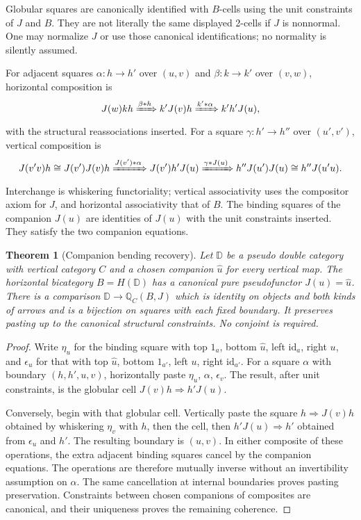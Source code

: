 \documentclass[11pt]{article}
\newtheorem{theorem}{Theorem}[section]
\theoremstyle{definition}
\newcommand{\id}{\mathrm{id}}
\newcommand{\Qrel}{\mathbb Q}
\begin{document}
Globular squares are canonically identified with $B$-cells using the unit
constraints of $J$ and $B$. They are not literally the same displayed
2-cells if $J$ is nonnormal. One may normalize $J$ or use those canonical
identifications; no normality is silently assumed.

For adjacent squares $\alpha:h\to h'$ over $(u,v)$ and
$\beta:k\to k'$ over $(v,w)$, horizontal composition is
\[
 J(w)kh\xRightarrow{\beta*h}k'J(v)h
       \xRightarrow{k'*\alpha}k'h'J(u),
\]
with the structural reassociations inserted. For a square $\gamma:h'\to h''$
over $(u',v')$, vertical composition is
\[
 J(v'v)h\cong J(v')J(v)h
 \xRightarrow{J(v')*\alpha}J(v')h'J(u)
 \xRightarrow{\gamma*J(u)}h''J(u')J(u)
 \cong h''J(u'u).
\]
Interchange is whiskering functoriality; vertical associativity uses the
compositor axiom for $J$, and horizontal associativity that of $B$. The
binding squares of the companion $J(u)$ are identities of $J(u)$ with the
unit constraints inserted. They satisfy the two companion equations.

\begin{theorem}[Companion bending recovery]\label{thm:bend}
Let $\mathbb D$ be a pseudo double category with vertical category $C$ and a
chosen companion $\widehat u$ for every vertical map. The horizontal
bicategory $B=H(\mathbb D)$ has a canonical pure pseudofunctor $J(u)=\widehat u$.
There is a comparison
$\mathbb D\to\Qrel_C(B,J)$ which is identity on objects and both kinds of
arrows and is a bijection on squares with each fixed boundary. It preserves
pasting up to the canonical structural constraints. No conjoint is required.
\end{theorem}
\begin{proof}
Write $\eta_u$ for the binding square with top $1_a$, bottom $\widehat u$,
left $\id_a$, right $u$, and $\epsilon_u$ for that with top $\widehat u$,
bottom $1_{a'}$, left $u$, right $\id_{a'}$. For a square $\alpha$ with
boundary $(h,h',u,v)$, horizontally paste $\eta_u$, $\alpha$, $\epsilon_v$.
The result, after unit constraints, is the globular cell
$J(v)h\Rightarrow h'J(u)$.

Conversely, begin with that globular cell. Vertically paste the square
$h\Rightarrow J(v)h$ obtained by whiskering $\eta_v$ with $h$, then the
cell, then $h'J(u)\Rightarrow h'$ obtained from $\epsilon_u$ and $h'$.
The resulting boundary is $(u,v)$. In either composite of these operations,
the extra adjacent binding squares cancel by the companion equations. The
operations are therefore mutually inverse without an invertibility
assumption on $\alpha$. The same cancellation at internal boundaries proves
pasting preservation. Constraints between chosen companions of composites
are canonical, and their uniqueness proves the remaining coherence.
\end{proof}
\end{document}
